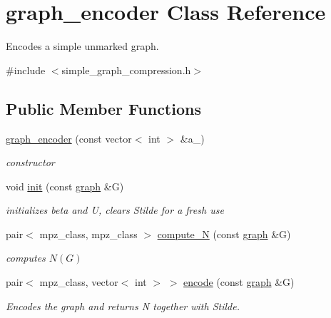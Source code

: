 \hypertarget{classgraph__encoder}{}\section{graph\+\_\+encoder Class Reference}
\label{classgraph__encoder}


Encodes a simple unmarked graph.  




{\ttfamily \#include $<$simple\+\_\+graph\+\_\+compression.\+h$>$}

\subsection*{Public Member Functions}
\begin{DoxyCompactItemize}
\item 
\hyperlink{classgraph__encoder_a571aefbf0b6ad203346fc4e0ef1a33dc}{graph\+\_\+encoder} (const vector$<$ int $>$ \&a\+\_\+)
\begin{DoxyCompactList}\small\item\em constructor \end{DoxyCompactList}\item 
void \hyperlink{classgraph__encoder_a6cfb6fca4bc50d4e5d267060a91f43c3}{init} (const \hyperlink{classgraph}{graph} \&G)
\begin{DoxyCompactList}\small\item\em initializes beta and U, clears Stilde for a fresh use \end{DoxyCompactList}\item 
pair$<$ mpz\+\_\+class, mpz\+\_\+class $>$ \hyperlink{classgraph__encoder_ad565513b399e97925babdb32d1c914f3}{compute\+\_\+N} (const \hyperlink{classgraph}{graph} \&G)
\begin{DoxyCompactList}\small\item\em computes $N(G)$ \end{DoxyCompactList}\item 
pair$<$ mpz\+\_\+class, vector$<$ int $>$ $>$ \hyperlink{classgraph__encoder_a23350e4c0986763b24d14c5ef1beb37e}{encode} (const \hyperlink{classgraph}{graph} \&G)
\begin{DoxyCompactList}\small\item\em Encodes the graph and returns N together with Stilde. \end{DoxyCompactList}\end{DoxyCompactItemize}
